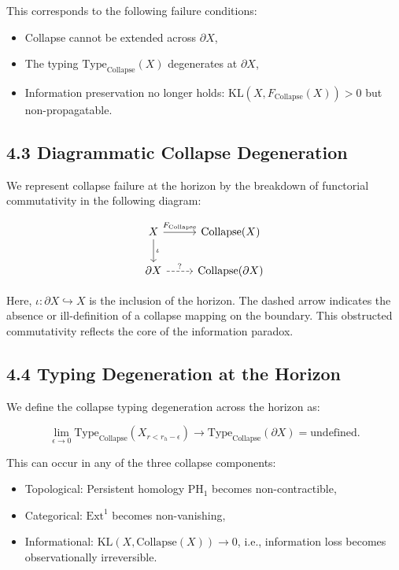 \documentclass[11pt]{article}
\begin{document}
This corresponds to the following failure conditions:

\begin{itemize}
    \item Collapse cannot be extended across \( \partial X \),
    \item The typing \( \mathrm{Type}_{\mathrm{Collapse}}(X) \) degenerates at \( \partial X \),
    \item Information preservation no longer holds: \( \mathrm{KL}(X, F_{\mathrm{Collapse}}(X)) > 0 \) but non-propagatable.
\end{itemize}

\subsection*{4.3 Diagrammatic Collapse Degeneration}

We represent collapse failure at the horizon by the breakdown of functorial commutativity in the following diagram:

\[
\begin{tikzcd}
X \arrow[r, "F_{\mathrm{Collapse}}"] \arrow[d, "\iota"]
& \mathrm{Collapse}(X) \\
\partial X \arrow[r, dashed, "?"]
& \mathrm{Collapse}(\partial X)
\end{tikzcd}
\]

Here, \( \iota: \partial X \hookrightarrow X \) is the inclusion of the horizon. The dashed arrow indicates the absence or ill-definition of a collapse mapping on the boundary. This obstructed commutativity reflects the core of the information paradox.

\subsection*{4.4 Typing Degeneration at the Horizon}

We define the collapse typing degeneration across the horizon as:

\[
\lim_{\epsilon \to 0} \mathrm{Type}_{\mathrm{Collapse}}(X_{r < r_h - \epsilon}) \to
\mathrm{Type}_{\mathrm{Collapse}}(\partial X) = \text{undefined}.
\]

This can occur in any of the three collapse components:

\begin{itemize}
    \item Topological: Persistent homology \( \mathrm{PH}_1 \) becomes non-contractible,
    \item Categorical: \( \mathrm{Ext}^1 \) becomes non-vanishing,
    \item Informational: \( \mathrm{KL}(X, \mathrm{Collapse}(X)) \to 0 \), i.e., information loss becomes observationally irreversible.
\end{itemize}
\end{document}
